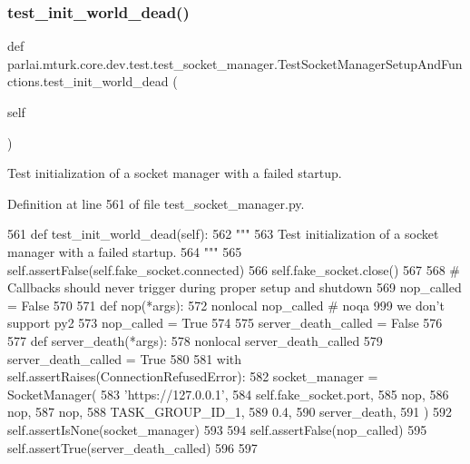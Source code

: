 \subsubsection{\texorpdfstring{test\+\_\+init\+\_\+world\+\_\+dead()}{test\_init\_world\_dead()}}
{\footnotesize\ttfamily def parlai.\+mturk.\+core.\+dev.\+test.\+test\+\_\+socket\+\_\+manager.\+Test\+Socket\+Manager\+Setup\+And\+Functions.\+test\+\_\+init\+\_\+world\+\_\+dead (\begin{DoxyParamCaption}\item[{}]{self }\end{DoxyParamCaption})}

\begin{DoxyVerb}Test initialization of a socket manager with a failed startup.
\end{DoxyVerb}
 

Definition at line 561 of file test\+\_\+socket\+\_\+manager.\+py.


\begin{DoxyCode}
561     \textcolor{keyword}{def }test\_init\_world\_dead(self):
562         \textcolor{stringliteral}{"""}
563 \textcolor{stringliteral}{        Test initialization of a socket manager with a failed startup.}
564 \textcolor{stringliteral}{        """}
565         self.assertFalse(self.fake\_socket.connected)
566         self.fake\_socket.close()
567 
568         \textcolor{comment}{# Callbacks should never trigger during proper setup and shutdown}
569         nop\_called = \textcolor{keyword}{False}
570 
571         \textcolor{keyword}{def }nop(*args):
572             nonlocal nop\_called  \textcolor{comment}{# noqa 999 we don't support py2}
573             nop\_called = \textcolor{keyword}{True}
574 
575         server\_death\_called = \textcolor{keyword}{False}
576 
577         \textcolor{keyword}{def }server\_death(*args):
578             nonlocal server\_death\_called
579             server\_death\_called = \textcolor{keyword}{True}
580 
581         with self.assertRaises(ConnectionRefusedError):
582             socket\_manager = SocketManager(
583                 \textcolor{stringliteral}{'https://127.0.0.1'},
584                 self.fake\_socket.port,
585                 nop,
586                 nop,
587                 nop,
588                 TASK\_GROUP\_ID\_1,
589                 0.4,
590                 server\_death,
591             )
592             self.assertIsNone(socket\_manager)
593 
594         self.assertFalse(nop\_called)
595         self.assertTrue(server\_death\_called)
596 
597 
\end{DoxyCode}


